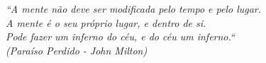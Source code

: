 \begin{epigrafe}
    \vspace*{\fill}
	\begin{flushright}
		\textit{``A mente não deve ser modificada pelo tempo e pelo lugar.\\
                          A mente é o seu próprio lugar, e dentro de si. \\ 
                          Pode fazer um inferno do céu, e do céu um inferno.`` \\ 
                          (Paraíso Perdido - John Milton)}
	\end{flushright}
\end{epigrafe}
